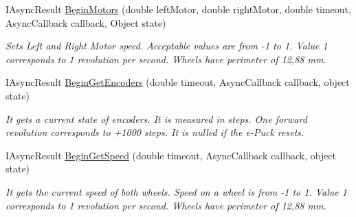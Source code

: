 \begin{DoxyCompactItemize}
  \item IAsyncResult \hyperlink{class_elib_1_1_epuck_aaa46f6da4226876036df7ba7cf2adca3}{BeginMotors} (double leftMotor, double rightMotor, double timeout, AsyncCallback callback, Object state)
  \begin{DoxyCompactList}\small\item\em Sets Left and Right Motor speed. Acceptable values are from -\/1 to 1. Value 1 corresponds to 1 revolution per second. Wheels have perimeter of 12,88 mm. \item\end{DoxyCompactList}

  \item  IAsyncResult \hyperlink{class_elib_1_1_epuck_ad4cfe3776708816e78a7c53ddde315fb}{BeginGetEncoders} (double timeout, AsyncCallback callback, object state)
  \begin{DoxyCompactList}\small\item\em It gets a current state of encoders. It is measured in steps. One forward revolution corresponds to +1000 steps.
  It is nulled if the e-\/Puck resets. \item\end{DoxyCompactList}

  \item   IAsyncResult \hyperlink{class_elib_1_1_epuck_a26cd19a983186a23aa49d99106bd33d1}{BeginGetSpeed} (double timeout, AsyncCallback callback, object state)
  \begin{DoxyCompactList}\small\item\em It gets the current speed of both wheels. Speed on a wheel is from -\/1 to 1. Value 1 corresponds to 1 revolution per second. Wheels have perimeter of 12,88 mm. \item\end{DoxyCompactList}

  \end{DoxyCompactItemize}

